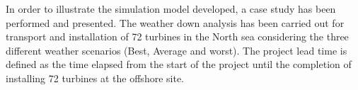 In order to illustrate the simulation model developed, a case study has been performed and presented. The weather down analysis has been carried out for transport and installation of 72 turbines in the North sea considering the three different weather scenarios (Best, Average and worst). The project lead time is defined as the time elapsed from the start of the project until the completion of installing 72 turbines at the offshore site. 
